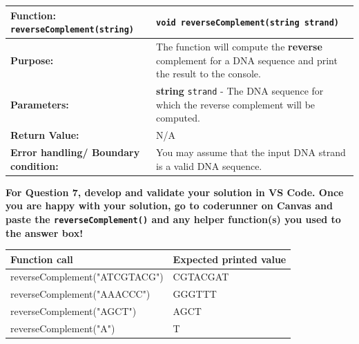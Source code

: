 \begin{longtable}{|p{1.7in}|p{4.0in}|}
    \hline
    \textbf{Function:} \texttt{reverseComplement(string)}
        & 
        \texttt{void reverseComplement(string strand)} 
        \\ \hline
    
    \textbf{Purpose:} 
        & 
        The function will compute the \textbf{reverse} complement for a DNA sequence and print the result to the console.
        \\ \hline
    
    \textbf{Parameters:} 
        & 
        \textbf{string} \texttt{strand} - The DNA sequence for which the reverse complement will be computed.
        \\ \hline
    
    \textbf{Return Value:} 
        & 
        N/A
        \\ \hline
    \textbf{Error handling/ Boundary condition:}
        &
        You may assume that the input DNA strand is a valid DNA sequence.
    \\ \hline
\end{longtable}

\textbf{For Question 7, develop and validate your solution in VS Code. Once you are happy with your solution, go to coderunner on Canvas and paste the \texttt{reverseComplement()} and any helper function(s) you used to the answer box!} 

\begin{sampleProject}
    \hspace{0pt}
    \begin{longtable}{|p{2.6in}|p{2.5in}|}
        \hline
        \textbf{Function call}
            & 
            \textbf{Expected printed value}
            \\ \hline
        
        reverseComplement("ATCGTACG")
            & 
            CGTACGAT
            \\ \hline
        
        reverseComplement("AAACCC")
            & 
            GGGTTT
            \\ \hline
        
        reverseComplement("AGCT")
            & 
            AGCT
            \\ \hline

        reverseComplement("A")
            & 
            T
            \\ \hline
    \end{longtable}
\end{sampleProject}

